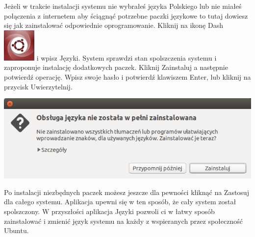 Jeżeli w trakcie instalacji systemu nie wybrałeś języka Polskiego lub nie miałeś połączenia z internetem aby ściągnąć potrzebne paczki językowe to tutaj dowiesz się jak zainstalować odpowiednie oprogramowanie.
Kliknij na ikonę Dash \includegraphics[scale=0.35]{images/ikony_dash.png} i wpisz \textcolor{ubuntu_orange}{Języki}. System sprawdzi stan spolszczenia systemu i zaproponuje instalację dodatkowych paczek. Kliknij \textcolor{ubuntu_orange}{Zainstaluj} a następnie potwierdź operację. Wpisz swoje hasło i potwierdź klawiszem Enter, lub kliknij na przycisk \textcolor{ubuntu_orange}{Uwierzytelnij}.
\begin{center}
	\vspace{-10pt}
	\includegraphics{images/pierwsze_uruchomienie_lang2.png}
\end{center}

Po instalacji niezbędnych paczek możesz jeszcze dla pewności kliknąć na \textcolor{ubuntu_orange}{Zastosuj dla całego systemu}. Aplikacja upewni się w ten sposób, że cały system został spolszczony.
W przyszłości aplikacja \textcolor{ubuntu_orange}{Języki} pozwoli ci w łatwy sposób zainstalować i zmienić język systemu na każdy z wspieranych przez społeczność Ubuntu.

